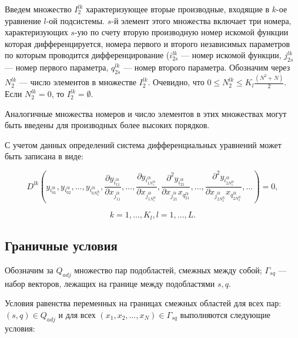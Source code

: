 \documentclass[a4paper,12pt]{article}
\begin{document}
  Введем множество $I_2^{lk}$ характеризующее вторые производные,
  входящие в $k$-ое уравнение $l$-ой подсистемы. $s$-й элемент этого
  множества включает три номера, характеризующих $s$-ую по счету
  вторую производную номер искомой функции которая дифференцируется,
  номера первого и второго независимых параметров по которым
  проводится дифференцирование ($i^{lk}_{2s}$ --- номер искомой
  функции, $j^{lk}_{2s}$ --- номер первого параметра, $q^{lk}_{2s}$
  --- номер второго параметра.  Обозначим через $N_{2}^{lk}$ --- число
  элементов в множестве $I_{2}^{lk}$. Очевидно, что $0 \le N_{2}^{lk}
  \le K_l \frac{(N^2+N)}{2}$.  Если $N_{2}^{lk} = 0$, то $I_{2}^{lk} =
  \emptyset$.

  Аналогичные множества номеров и число элементов в этих множествах
  могут быть введены для производных более высоких порядков.

  С учетом данных определений система дифференциальных уравнений может
  быть записана в виде:
  

  \begin{equation}
    \label{pdegen}
    D^{lk} (
    y_{i^{lk}_{01}}, y_{i^{lk}_{02}}, \ldots,y_{i^{lk}_{0N^{lk}_0}},
    \frac{\partial y_{i^{lk}_{11}}}{\partial x_{j^{lk}_{11}}},\ldots,
    \frac{\partial y_{i^{lk}_{1N^{lk}_1}}}{\partial x_{j^{lk}_{1N^{lk}_1}}},
    \frac{\partial^2 y_{i^{lk}_{21}}}{\partial x_{j^{lk}_{21}}x_{q^{lk}_{21}}},\ldots,
    \frac{\partial^2 y_{i^{lk}_{2N^{lk}_1}}}{\partial x_{j^{lk}_{2N^{lk}_2}}x_{q^{lk}_{2N^{lk}_2}}},
    \ldots) = 0,
  \end{equation}

  \begin{equation*}
    k = 1,\ldots,K_l,l = 1,\ldots,L.
  \end{equation*}  

  \subsection{Граничные условия}

  Обозначим за $Q_{adj}$ множество пар подобластей, смежных между
  собой; $\Gamma_{sq}$ --- набор векторов, лежащих на границе между
  подобластями $s,q$.
  
  Условия равенства переменных на границах смежных областей для всех
  пар: $(s,q) \in Q_{adj}$ и для всех $\left(x_1,x_2,\ldots,x_N\right)
  \in \Gamma_{sq}$ выполняются следующие условия:
\end{document}
